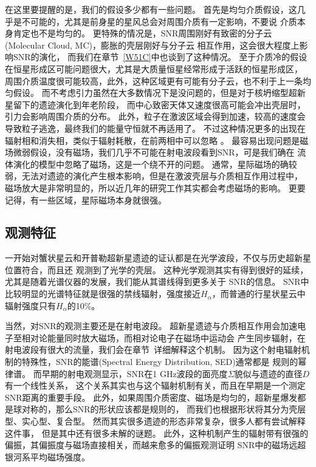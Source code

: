 在这里要提醒的是，我们的假设多少都有一些问题。
首先是均匀介质假设，这几乎是不可能的，尤其是前身星的星风总会对周围介质有一定影响，不要说
介质本身肯定也不是均匀的。
更特殊的情况是，SNR周围刚好有致密的分子云(Molecular Cloud, MC)，膨胀的壳层刚好与分子云
相互作用，这会很大程度上影响SNR的演化\citep{1972PhDT........47S, Orlando2008, Zhang2017}，
而我们在章节~\ref{W51C}中也谈到了这种情况。
至于介质冷的假设在恒星形成区可能问题很大，尤其是大质量恒星经常形成于活跃的恒星形成区，
周围介质温度很可能较高，此外，这种区域更有可能有分子云，也不利于上一条均匀假设。
而不考虑引力虽然在大多数情况下是没问题的，但是对于核坍缩型超新星留下的遗迹演化到年老阶段，
而中心致密天体又速度很高可能会冲出壳层时，引力会影响周围介质的分布。
此外，粒子在激波区域会得到加速，较高的速度会导致粒子逃逸，最终我们的能量守恒就不再适用了。
不过这种情况更多的出现在辐射相和消失相，类似于辐射耗散，在前两相中可以忽略
\citep{1967IAUS...31..117K}。
最容易出现问题是磁场微弱假设，没有磁场，我们几乎不可能在射电波段看到SNR，可是我们确在
流体演化的模型中忽略了磁场，这是一个绕不开的问题。
通常，星际磁场的确较弱，无法对遗迹的演化产生根本影响，但是在激波壳层与介质相互作用过程中，
磁场放大是非常明显的，所以近几年的研究工作其实都会考虑磁场的影响。
更要记得，有一些区域，星际磁场本身就很强。

\subsection{观测特征}
一开始对蟹状星云和开普勒超新星遗迹的证认都是在光学波段，不仅与历史超新星位置符合，而且还
观测到了光学的壳层。
这种光学观测其实有得到很好的延续，尤其是随着光谱仪器的发展，我们能从其谱线得到更多关于
SNR的信息。
SNR中比较明显的光谱特征就是很强的禁线辐射，强度接近$H_\alpha$，而普通的行星状星云中
辐射强度只有$H_\alpha$的10\%。

当然，对SNR的观测主要还是在射电波段。
超新星遗迹与介质相互作用会加速电子至相对论能量同时放大磁场，而相对论电子在磁场中运动会
产生同步辐射，在射电波段有很大的流量，我们会在章节~\label{TheoryDSACR}详细解释这个机制。
因为这个射电辐射机制的特殊性，SNR的能谱(Spectral Energy Distribution, SED)通常都是
规则的幂律谱。
而早期的射电观测显示，SNR在1 GHz波段的面亮度$\Sigma$貌似与遗迹的直径$D$有一个线性关系，
这个关系其实也与这个辐射机制有关，而且在早期是一个测定SNR距离的重要手段。
此外，如果周围介质密度、磁场是均匀的，超新星爆发都是球对称的，那么SNR的形状应该都是规则的，
而我们也根据形状将其分为壳层型、实心型、复合型。
然而其实很多遗迹的形态非常复杂\citep{West2016}，很多人都有尝试解释这件事\citep{Zhang2018}，
但是其中还有很多未解的谜题。
此外，这种机制产生的辐射带有很强的偏振，其偏振度与磁场直接相关，而越来愈多的偏振观测证明
SNR中的磁场远超银河系平均磁场强度。

